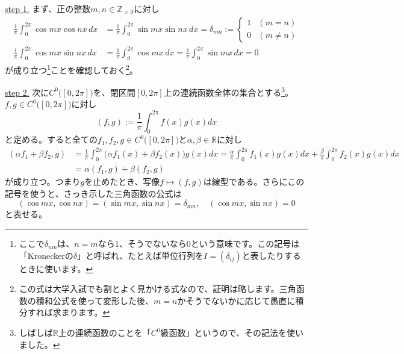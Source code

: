 \noindent \underline{step 1.}
まず、正の整数$m, n \in \mathbb{Z}_{>0}$に対し
\begin{align*}
\frac{1}{\pi}\int_0^{2\pi} \cos mx \cos nx \, dx &=
\frac{1}{\pi}\int_0^{2\pi} \sin mx \sin nx \, dx
= \delta_{mn} :=
\begin{cases}
1 & (m = n) \\
0 & (m \neq n)
\end{cases} \\
\frac{1}{\pi}\int_0^{2\pi} \cos mx \sin nx \, dx &= \frac{1}{\pi}\int_0^{2\pi} \cos mx \, dx = \frac{1}{\pi}\int_0^{2\pi} \sin mx \, dx = 0
\end{align*}
が成り立つ\footnote{ここで$\delta_{nm}$は、$n = m$なら$1$、そうでないなら$0$という意味です。この記号は「Kroneckerの$\delta$」と呼ばれ、たとえば単位行列を$I = (\delta_{ij})$と表したりするときに使います。}ことを確認しておく\footnote{この式は大学入試でも割とよく見かける式なので、証明は略します。三角函数の積和公式を使って変形した後、$m = n$かそうでないかに応じて愚直に積分すれば求まります。}。

\noindent \underline{step 2.} 次に$C^0\bigl([0, 2\pi]\bigr)$を、閉区間$[0, 2\pi]$上の連続函数全体の集合とする\footnote{しばしば$\mathbb{R}$上の連続函数のことを「$C^0$級函数」というので、その記法を使いました。}。$f, g \in C^0\bigl([0, 2\pi]\bigr)$に対し
\[
(f, g) := \frac{1}{\pi} \int_0^{2\pi} f(x) g(x) dx
\]
と定める。すると全ての$f_1, f_2, g \in C^0\bigl([0, 2\pi]\bigr)$と$\alpha, \beta\in\mathbb{R}$に対し
\begin{align*}
(\alpha f_1 + \beta f_2, g)
&=
\frac{1}{\pi} \int_0^{2\pi} \bigl(\alpha f_1(x) + \beta f_2(x)\bigr) g(x) dx
= \frac{\alpha}{\pi} \int_0^{2\pi} f_1(x) g(x) dx + \frac{\beta}{\pi} \int_0^{2\pi} f_2(x) g(x) dx \\
&= \alpha(f_1, g) + \beta(f_2, g)
\end{align*}
が成り立つ。つまり$g$を止めたとき、写像$f \mapsto (f, g)$は線型である。さらにこの記号を使うと、さっき示した三角函数の公式は
\[
(\cos mx , \cos nx ) = (\sin mx, \sin nx) = \delta_{mn},\quad (\cos mx, \sin nx) = 0
\]
と表せる。

